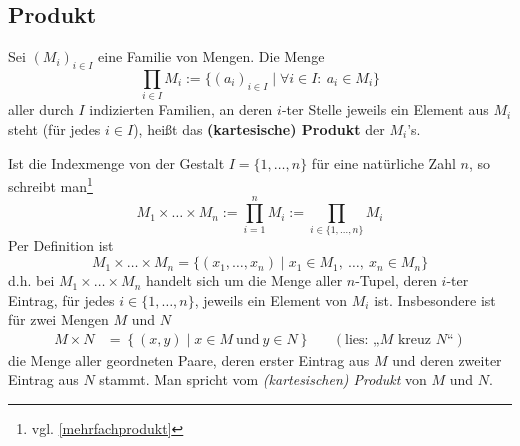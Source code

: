 \subsection*{Produkt}


\begin{defin}  
    Sei $(M_i)_{i\in I}$ eine Familie von Mengen. Die Menge
        \[ \prod_{i\in I} M_i := \{ (a_i)_{i\in I} \mid \forall i\in I:\ a_i\in M_i \} \]
    aller durch $I$ indizierten Familien, an deren $i$-ter Stelle jeweils ein Element aus $M_i$ steht (für jedes $i\in I$), heißt das \textbf{(kartesische) Produkt} der $M_i$'s.

    Ist die Indexmenge von der Gestalt $I=\{1,\dots , n\}$ für eine natürliche Zahl $n$, so schreibt man\footnote{vgl. \cref{mehrfachprodukt}}
        \[ M_1\times\ldots\times M_n := \prod_{i=1}^n M_i := \prod_{i\in \{1,\dots , n\}} M_i   \]
    Per Definition ist
        \[ M_1\times\ldots\times M_n = \{ (x_1,\dots , x_n) \mid x_1\in M_1,\ \ldots,\ x_n\in M_n \} \]
    d.h. bei $M_1\times\ldots\times M_n$ handelt sich um die Menge aller $n$-Tupel, deren $i$-ter Eintrag, für jedes $i\in \{1,\dots , n\}$, jeweils ein Element von $M_i$ ist.
    Insbesondere ist für zwei Mengen $M$ und $N$
    \begin{align*}
        M \times N & = \left\{ (x,y) \mid x\in M\ \text{und}\ y\in N \right\}  && (\text{lies: „$M$ kreuz $N$“})
    \end{align*}
    die Menge aller geordneten Paare, deren erster Eintrag aus $M$ und deren zweiter Eintrag aus $N$ stammt. Man spricht vom \emph{(kartesischen) Produkt} von $M$ und $N$.
\end{defin}


